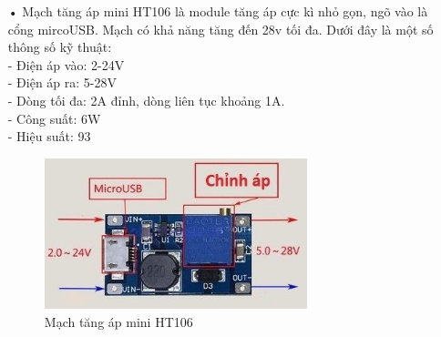\begin{itemize}
	\item[•]Mạch tăng áp mini HT106 là module tăng áp cực kì nhỏ gọn, ngõ vào là cổng mircoUSB. Mạch có khả năng tăng đến 28v tối đa. Dưới đây là một số thông số kỹ thuật:\\
	-	Điện áp vào: 2-24V\\
	-	Điện áp ra: 5-28V\\
	-	Dòng tối đa: 2A đỉnh, dòng liên tục khoảng 1A.\\
	-	Công suất: 6W\\
	-	Hiệu suất: 93%
	\begin{figure}[H]
		\centering    
		\includegraphics[width=3in]{ht06}
		\caption[Mạch tăng áp mini HT106]{Mạch tăng áp mini HT106}
		\label{fig:ht06}
	\end{figure}
	

\end{itemize}
